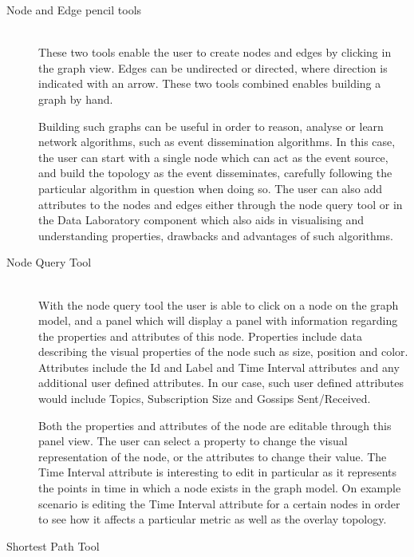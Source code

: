 \begin{description}

\item[Node and Edge pencil tools] \hfill \\

    These two tools enable the user to create nodes and edges by
    clicking in the graph view. Edges can be undirected or directed,
    where direction is indicated with an arrow. These two tools combined
    enables building a graph by hand.

    Building such graphs can be useful in order to reason, analyse or
    learn network algorithms, such as event dissemination algorithms. In
    this case, the user can start with a single node which can act as
    the event source, and build the topology as the event disseminates,
    carefully following the particular algorithm in question when doing
    so. The user can also add attributes to the nodes and edges either
    through the node query tool or in the Data Laboratory component
    which also aids in visualising and understanding properties,
    drawbacks and advantages of such algorithms.

\item[Node Query Tool] \hfill \\

    With the node query tool the user is able to click on a node on the
    graph model, and a panel which will display a panel with information
    regarding the properties and attributes of this node. Properties include
    data describing the visual properties of the node such as size, position
    and color. Attributes include the Id and Label and Time Interval
    attributes and any additional user defined attributes. In our case, such
    user defined attributes would include Topics, Subscription Size and
    Gossips Sent/Received.

    Both the properties and attributes of the node are editable through this
    panel view. The user can select a property to change the visual
    representation of the node, or the attributes to change their value. The
    Time Interval attribute is interesting to edit in particular as it
    represents the points in time in which a node exists in the graph model.
    On example scenario is editing the Time Interval attribute for a certain
    nodes in order to see how it affects a particular metric as well as the
    overlay topology.

\item[Shortest Path Tool] \hfill \\


\end{description}
